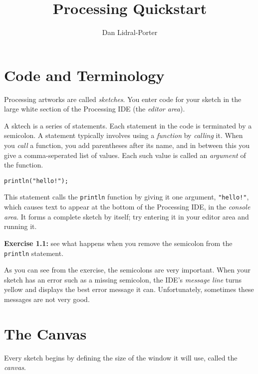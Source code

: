 \documentclass[
]{leaflet}
\title{Processing Quickstart\vspace{-2ex}}
\author{%
  Dan Lidral-Porter\vspace{-2ex}
}
\date{}
\begin{document}


\maketitle
\thispagestyle{empty}


\section{Code and Terminology}

Processing artworks are called \textit{sketches}.
You enter code for your sketch in the large white section of the Processing IDE (the \textit{editor area}).

A sktech is a series of statements.
Each statement in the code is terminated by a semicolon.
A statement typically involves using a \textit{function} by \textit{calling} it.
When you \textit{call} a function, you add parentheses after its name, and in between this you give a comma-seperated list of values.
Each such value is called an \textit{argument} of the function.

\begin{lstlisting}
println("hello!");
\end{lstlisting}
\vspace{-0.5em}
This statement calls the \texttt{println} function by giving it one argument, \texttt{"hello!"}, which causes text to appear at the bottom of the Processing IDE, in the \textit{console area}.
It forms a complete sketch by itself; try entering it in your editor area and running it.

\textbf{Exercise 1.1:} see what happens when you remove the semicolon from the \texttt{println} statement.

As you can see from the exercise, the semicolons are very important.
When your sketch has an error such as a missing semicolon, the IDE's \textit{message line} turns yellow and displays the best error message it can.
Unfortunately, sometimes these messages are not very good.

\section{The Canvas}

Every sketch begins by defining the size of the window it will use, called the \textit{canvas}.
\end{document}
